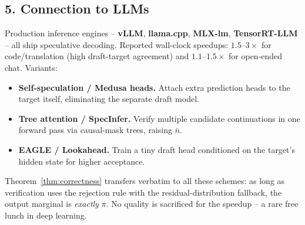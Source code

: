 \subsection*{5. Connection to LLMs}

Production inference engines -- \textbf{vLLM}, \textbf{llama.cpp}, \textbf{MLX-lm}, \textbf{TensorRT-LLM} -- all ship speculative decoding. Reported wall-clock speedups: $1.5$--$3\times$ for code/translation (high draft-target agreement) and $1.1$--$1.5\times$ for open-ended chat. Variants:

\begin{itemize}
  \item \textbf{Self-speculation / Medusa heads.} Attach extra prediction heads to the target itself, eliminating the separate draft model.
  \item \textbf{Tree attention / SpecInfer.} Verify multiple candidate continuations in one forward pass via causal-mask trees, raising $\bar n$.
  \item \textbf{EAGLE / Lookahead.} Train a tiny draft head conditioned on the target's hidden state for higher acceptance.
\end{itemize}

Theorem~\ref{thm:correctness} transfers verbatim to all these schemes: as long as verification uses the rejection rule with the residual-distribution fallback, the output marginal is \emph{exactly} $\pi$. No quality is sacrificed for the speedup -- a rare free lunch in deep learning.
